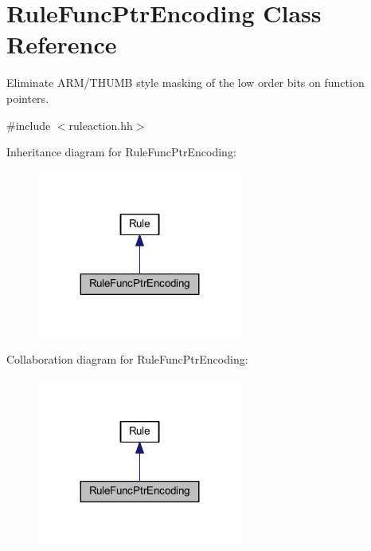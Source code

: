 \hypertarget{class_rule_func_ptr_encoding}{}\section{Rule\+Func\+Ptr\+Encoding Class Reference}
\label{class_rule_func_ptr_encoding}


Eliminate A\+R\+M/\+T\+H\+U\+MB style masking of the low order bits on function pointers.  




{\ttfamily \#include $<$ruleaction.\+hh$>$}



Inheritance diagram for Rule\+Func\+Ptr\+Encoding\+:
\nopagebreak
\begin{figure}[H]
\begin{center}
\leavevmode
\includegraphics[width=191pt]{class_rule_func_ptr_encoding__inherit__graph}
\end{center}
\end{figure}


Collaboration diagram for Rule\+Func\+Ptr\+Encoding\+:
\nopagebreak
\begin{figure}[H]
\begin{center}
\leavevmode
\includegraphics[width=191pt]{class_rule_func_ptr_encoding__coll__graph}
\end{center}
\end{figure}
